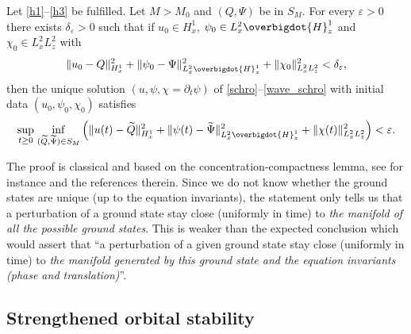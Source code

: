 \begin{theo}\label{orbital_stab_1}
Let \eqref{h1}--\eqref{h3} be fulfilled. Let $M>M_{0}$ and $(Q,\Psi)$ be in $S_{M}$. For every $\varepsilon>0$ there exists $\delta_{\varepsilon}>0$ such that if $u_{0}\in H_{x}^{1}$, $\psi_{0}\in L_{x}^{2}\overbigdot{H}_{z}^{1}$ and $\chi_{0}\in L_{x}^{2}L_{z}^{2}$ with
\[
\|u_{0}-Q\|_{H_{x}^{1}}^{2}+\|\psi_{0}-\Psi\|_{L_{x}^{2}\overbigdot{H}_{z}^{1}}^{2}+\|\chi_{0}\|_{L_{x}^{2}L_{z}^{2}}^{2}<\delta_{\varepsilon},
\]
then the unique solution $(u,\psi,\chi=\partial_t\psi)$ of \eqref{schro}--\eqref{wave_schro} with initial data $(u_{0},\psi_{0},\chi_{0})$ satisfies
\[
\underset{t\geq 0}{\sup}\;\underset{(\widetilde{Q},\widetilde{\Psi})\in S_{M}}{\inf}\left(\|u(t)-\widetilde{Q}\|_{H_{x}^{1}}^{2}+\|\psi(t)-\widetilde{\Psi}\|_{L_{x}^{2}\overbigdot{H}_{z}^{1}}^{2}+\|\chi(t)\|_{L_{x}^{2}L_{z}^{2}}^{2}\right)<\varepsilon.
\]
\end{theo}
The proof is classical and based on the concentration-compactness lemma, see for instance \cite{Cazenave_Lions_orbital_stab, PLLcc1, PLLcc2} and the references therein.
Since we do not know whether the ground states are unique (up to the equation invariants),
the statement
only tells us that a perturbation of a ground state stay close (uniformly in time) to \emph{the manifold of all the possible ground states}.
This is weaker than the
expected conclusion which would assert that ``a perturbation of a given ground state stay close (uniformly in time) to \emph{the manifold generated by this ground state and the equation invariants (phase and translation)}''.

\subsection{Strengthened orbital stability}

